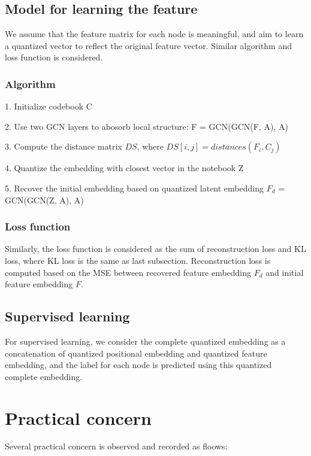 \documentclass[12pt]{amsart}
\begin{document}
\subsection{Model for learning the feature}

\hfill

We assume that the feature matrix for each node is meaningful, 
and aim to learn a quantized vector to reflect the original feature vector. Similar algorithm and loss function is considered.

\subsubsection{Algorithm}
\hfill

1. Initialize codebook C

2. Use two GCN layers to abosorb local structure: F = GCN(GCN(F, A), A)

3. Compute the distance matrix $DS$, where $DS[i,j] = distances(F_i, C_j)$  

4. Quantize the embedding with closest vector in the notebook Z 

5. Recover the initial embedding based on quantized latent embedding $F_d$ = GCN(GCN(Z, A), A)

\subsubsection{Loss function}
\hfill

Similarly, the loss function is considered as the sum of reconstruction loss and KL loss, where KL 
loss is the same as last subsection. Reconstruction loss is computed based on the MSE between recovered feature embedding $F_d$ and initial feature embedding $F$.


\subsection{Supervised learning}
For supervised learning, we consider the complete quantized embedding as a concatenation of quantized positional embedding and quantized feature embedding, and the label for each node is predicted using this quantized complete embedding.



\section{Practical concern}
Several practical concern is observed and recorded as floows:
\end{document}
